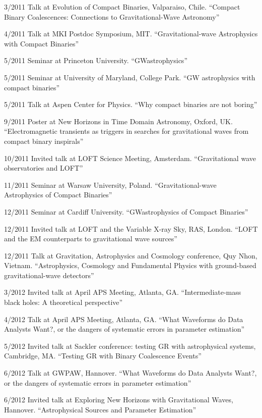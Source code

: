 \documentclass[margin,line]{res}
\begin{document}
\begin{resume}
3/2011 	Talk at Evolution of Compact Binaries, Valparaiso, Chile. 	``Compact Binary Coalescences: Connections to Gravitational-Wave Astronomy'' 

4/2011 	Talk 	at MKI Postdoc Symposium, MIT. 	``Gravitational-wave Astrophysics with Compact Binaries''

5/2011 	Seminar 	at Princeton University.	``GWastrophysics''

5/2011 	Seminar 	at University of Maryland, College Park. 	``GW astrophysics with compact binaries''

5/2011 	Talk at Aspen Center for Physics. 	``Why compact binaries are not boring''

9/2011	Poster at New Horizons in Time Domain Astronomy, Oxford, UK.  ``Electromagnetic transients as triggers in searches for gravitational waves from compact binary inspirals''

10/2011	Invited talk at LOFT Science Meeting, Amsterdam. ``Gravitational wave observatories and LOFT''

11/2011	Seminar at Warsaw University, Poland. ``Gravitational-wave Astrophysics of Compact Binaries''

12/2011	Seminar at Cardiff University. 	``GWastrophysics of Compact Binaries''

12/2011	Invited talk at LOFT and the Variable X-ray Sky, RAS, London. ``LOFT and the EM counterparts to gravitational wave sources''

12/2011	Talk at Gravitation, Astrophysics and Cosmology conference, Quy Nhon, Vietnam.  ``Astrophysics, Cosmology and Fundamental Physics with ground-based gravitational-wave detectors''

3/2012 	Invited talk at April APS Meeting, Atlanta, GA. 	``Intermediate-mass black holes: A theoretical perspective''

4/2012 	Talk 	at April APS Meeting, Atlanta, GA.  ``What Waveforms do Data Analysts Want?, or the dangers of systematic errors in parameter estimation''

5/2012 	Invited talk at Sackler conference: testing GR with astrophysical systems, Cambridge, MA. 	``Testing GR with Binary Coalescence Events''

6/2012 	Talk 	at GWPAW, Hannover.  ``What Waveforms do Data Analysts Want?, or the dangers of systematic errors in parameter estimation''

6/2012 	Invited talk at Exploring New Horizons with Gravitational Waves, Hannover.   ``Astrophysical Sources and Parameter Estimation''


\end{resume}
\end{document}

